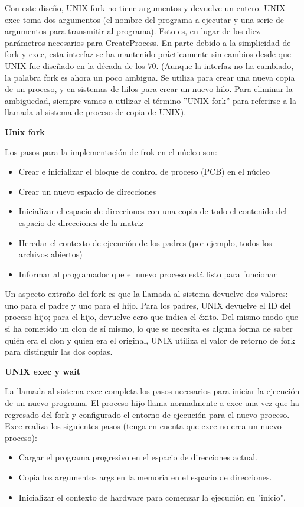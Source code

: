 \documentclass[10pt]{book}
\begin{document}
Con este diseño, UNIX fork no tiene argumentos y devuelve un entero. UNIX exec toma dos argumentos (el nombre del programa a ejecutar y una serie de argumentos para transmitir al programa). Esto es, en lugar de los diez parámetros necesarios para CreateProcess. En parte debido a la simplicidad de fork y exec, esta interfaz se ha mantenido prácticamente sin cambios desde que UNIX fue diseñado en la década de los $70$. (Aunque la interfaz no ha cambiado, la palabra fork es ahora un poco ambigua. Se utiliza para crear una nueva copia de un proceso, y en sistemas de hilos para crear un nuevo hilo. Para eliminar la ambigüedad, siempre vamos a utilizar el término ''UNIX fork'' para referirse a la llamada al sistema de proceso de copia de UNIX).

\setlength{\parindent}{20pt} \textbf{Unix fork} \setlength{\parindent}{0pt}

Los pasos para la implementación de frok en el núcleo son:
\begin{itemize}
\item Crear e inicializar el bloque de control de proceso (PCB) en el núcleo
\item Crear un nuevo espacio de direcciones
\item Inicializar el espacio de direcciones con una copia de todo el contenido del espacio de direcciones de la matriz
\item Heredar el contexto de ejecución de los padres (por ejemplo, todos los archivos abiertos)
\item Informar al programador que el nuevo proceso está listo para funcionar
\end{itemize}

Un aspecto extraño del fork es que la llamada al sistema devuelve dos valores: uno para el padre y uno para el hijo. Para los padres, UNIX devuelve el ID del proceso hijo; para el hijo, devuelve cero que indica el éxito. Del mismo modo que si ha cometido un clon de sí mismo, lo que se necesita es alguna forma de saber quién era el clon y quien era el original, UNIX utiliza el valor de retorno de fork para distinguir las dos copias.

\setlength{\parindent}{20pt} \textbf{UNIX exec y wait} \setlength{\parindent}{0pt}

La llamada al sistema exec completa los pasos necesarios para iniciar la ejecución de un nuevo programa. El proceso hijo llama normalmente a exec una vez que ha regresado del fork y configurado el entorno de ejecución para el nuevo proceso. Exec realiza los siguientes pasos (tenga en cuenta que exec no crea un nuevo proceso):
\begin{itemize}
\item Cargar el programa progresivo en el espacio de direcciones actual.
\item Copia los argumentos args en la memoria en el espacio de direcciones.
\item Inicializar el contexto de hardware para comenzar la ejecución en "inicio".
\end{itemize}
\end{document}
